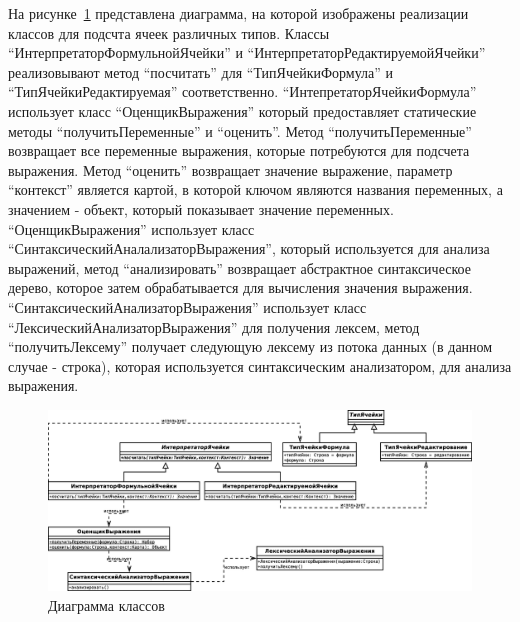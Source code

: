 \documentclass[14pt,a4paper]{reportmod}
\begin{document}
На рисунке~\ref{pic:classes_3} представлена диаграмма, на которой изображены реализации классов для подсчта ячеек различных типов. Классы ``ИнтерпретаторФормульнойЯчейки'' и ``ИнтерпретаторРедактируемойЯчейки'' реализовывают метод ``посчитать'' для ``ТипЯчейкиФормула'' и ``ТипЯчейкиРедактируемая'' соответственно. ``ИнтепретаторЯчейкиФормула'' использует класс ``ОценщикВыражения'' который предоставляет статические методы ``получитьПеременные'' и ``оценить''. Метод ``получитьПеременные'' возвращает все переменные выражения, которые потребуются для подсчета выражения. Метод ``оценить'' возвращает значение выражение, параметр ``контекст'' является картой, в которой ключом являются названия переменных, а значением - объект, который показывает значение переменных. ``ОценщикВыражения'' использует класс ``СинтаксическийАналализаторВыражения'', который используется для анализа выражений, метод ``анализировать'' возвращает абстрактное синтаксическое дерево, которое затем обрабатывается для вычисления значения выражения. ``СинтаксическийАнализаторВыражения'' использует класс ``ЛексическийАнализаторВыражения'' для получения лексем, метод ``получитьЛексему'' получает следующую лексему из потока данных (в данном случае - строка), которая используется синтаксическим анализатором, для анализа выражения.
\begin{figure}
  \centering
  \includegraphics[scale=0.26]{uml/classes_3}
  \caption{Диаграмма классов}
  \label{pic:classes_3}
\end{figure}
\end{document}
